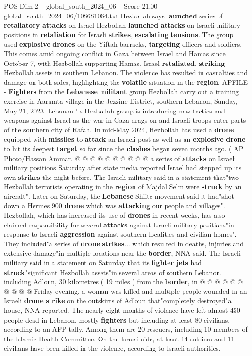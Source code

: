 \begin{textsample}{POS Dim 2 – global\_south\_2024\_06 – Score 21.00 – global\_south\_2024\_06/108681064.txt}  \label{ex:f2_pos_118}
Hezbollah says \textbf{launched} series of \textbf{retaliatory} \textbf{attacks} on Israel Hezbollah \textbf{launched} \textbf{attacks} on Israeli military positions in \textbf{retaliation} for Israeli \textbf{strikes}, \textbf{escalating} \textbf{tensions}.
The group used \textbf{explosive} \textbf{drones} on the Yiftah barracks, \textbf{targeting} officers and soldiers.
This comes amid ongoing conflict in Gaza between Israel and Hamas since October 7, with Hezbollah supporting Hamas.
Israel \textbf{retaliated}, \textbf{striking} Hezbollah assets in southern Lebanon.
The violence has resulted in casualties and damage on both sides, highlighting the \textbf{volatile} situation in the \textbf{region}.
APFILE - \textbf{Fighters} from the \textbf{Lebanese} \textbf{militant} group Hezbollah carry out a training exercise in Aaramta village in the Jezzine District, southern Lebanon, Sunday, May 21, 2023.
Lebanon ' s Hezbollah group is introducing new tactics and weapons against Israel as the war in Gaza drags on and Israeli troops enter parts of the southern city of Rafah.
In mid-May 2024, Hezbollah has used a \textbf{drone} equipped with \textbf{missiles} to \textbf{attack} an Israeli post as well as an \textbf{explosive} \textbf{drone} to hit its deepest \textbf{target} so far since the \textbf{clashes} began seven months ago. ( AP Photo/Hassan Ammar, @ @ @ @ @ @ @ @ @ @ a series of \textbf{attacks} on Israeli military positions Saturday after state media reported Israel had stepped up its own \textbf{strikes} the night before.
The Israeli military said in a statement that"two Hezbollah terrorists operating in the \textbf{region} of Majdal Selm were \textbf{struck} by an aircraft".
Later on Saturday, the \textbf{Lebanese} Shiite movement said it had"shot down a Hermes 900 \textbf{drone} which was \textbf{attacking} our people and villages".
Hezbollah, which has increased its use of \textbf{drones} in recent weeks, has also claimed responsibility for several \textbf{attacks} against Israeli military positions"in response to Israeli \textbf{aggression} against southern localities and civilian homes".
They included"a series of \textbf{drone} \textbf{strikes}... which resulted in deaths, injuries and extensive damage"in multiple locations near the \textbf{border}, NNA said.
The Israeli military said in a statement on Saturday that its \textbf{fighter} \textbf{jets} had \textbf{struck}"significant Hezbollah assets"in several areas of southern Lebanon, including Adloun, 30 kilometres ( 19 miles ) from the \textbf{border}, in @ @ @ @ @ @ @ @ @ @ Friday evening, a woman was killed and multiple people wounded in an Israeli \textbf{drone} \textbf{strike} on the outskirts of Adloun that"completely destroyed"a house, NNA reported.
The nearly eight months of violence have left almost 450 people dead in Lebanon, mostly \textbf{fighters} but including at least 80 civilians, according to an AFP tally.
Among them are 20 rescuers, including 10 members of the Islamic Health Committee.
On the Israeli side, at least 14 soldiers and 11 civilians have been killed in the violence, according to Israeli authorities.


\end{textsample}
